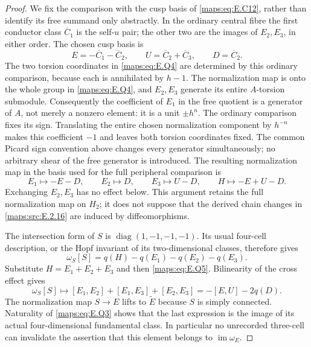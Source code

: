 \begin{proof}
We fix the comparison with the cusp basis of \eqref{maps:eq:E.C12}, rather
than identify its free summand only abstractly.  In the ordinary
central fibre the first conductor class $\overline C_1$ is the
self-$u$ pair; the other two are the images of $E_2,E_3$,
in either order.  The chosen cusp basis is
\[
 E=-\overline C_1-\overline C_2,\qquad
 U=\overline C_2+\overline C_3,\qquad D=\overline C_2.
\]
The two torsion coordinates in \eqref{maps:eq:E.Q4} are determined by
this ordinary comparison, because each is annihilated by
$h-1$.  The normalization map is onto the whole group in
\eqref{maps:eq:E.Q4}, and $E_2,E_3$ generate its entire $A$-torsion
submodule.  Consequently the coefficient of $E_1$ in the
free quotient is a generator of $A$, not merely a nonzero
element: it is a unit $\pm h^n$.  The ordinary comparison
fixes its sign.  Translating the entire chosen normalization
component by $h^{-n}$ makes this coefficient $-1$ and leaves
both torsion coordinates fixed.  The common Picard sign
convention above changes every generator simultaneously;
no arbitrary shear of the free generator is introduced.
The resulting
normalization map in the basis used for the full peripheral
comparison is
\[
 E_1\longmapsto-E-D,\qquad
 E_2\longmapsto D,\qquad E_3\longmapsto U-D,
 \qquad H\longmapsto-E+U-D.
 \tag{E.Q5}\label{maps:eq:E.Q5}
\]
Exchanging $E_2,E_3$ has no effect below.  This argument
retains the full normalization map on $H_2$; it does not
suppose that the derived chain changes in \ref{maps:src:E.2.16} are induced
by diffeomorphisms.

The intersection form of $S$ is
$\operatorname{diag}(1,-1,-1,-1)$.  Its usual four-cell
description, or the Hopf invariant of its two-dimensional
classes, therefore gives
\[
 \omega_S[S]=q(H)-q(E_1)-q(E_2)-q(E_3).
\]
Substitute $H=E_1+E_2+E_3$ and then \eqref{maps:eq:E.Q5}.  Bilinearity
of the cross effect gives
\[
 \omega_S[S]\longmapsto
 [E_1,E_2]+[E_1,E_3]+[E_2,E_3]
                      =-[E,U]-2q(D).
 \tag{E.Q6}\label{maps:eq:E.Q6}
\]
The normalization map $S\to E$ lifts to $\widetilde E$
because $S$ is simply connected.  Naturality of \eqref{maps:eq:E.Q3}
shows that the last expression is the image of its actual
four-dimensional fundamental class.  In particular no
unrecorded three-cell can invalidate the assertion that
this element belongs to $\operatorname{im}\omega_E$.


\end{proof}
